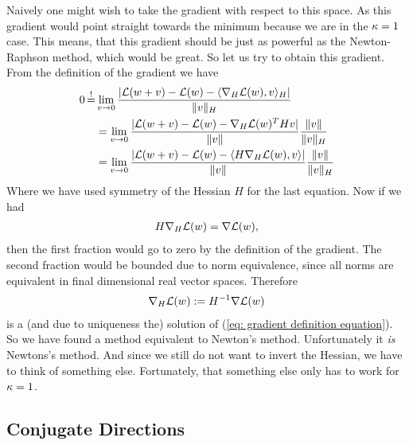 Naively one might wish to take the gradient with respect to this space. As this
gradient would point straight towards the minimum because we are in the
\(\kappa=1\) case. This means, that this gradient should be just as
powerful as the Newton-Raphson method, which would be great. So let us try to
obtain this gradient. From the definition of the gradient we have
\begin{align}
	\label{eq: gradient definition equation}
	0\xeq{!}&\lim_{v\to 0}\frac{
		|\Loss(\weights + v) - \Loss(\weights) - \langle \nabla_H\Loss(\weights), v\rangle_H |
	}{\|v\|_H}\\
	\nonumber
	&=\lim_{v\to 0}\frac{
		|\Loss(\weights + v) - \Loss(\weights) -  \nabla_H\Loss(\weights)^T H v |
	}{\|v\|}
	\frac{\|v\|}{\|v\|_H}\\
	\nonumber
	&=\lim_{v\to 0}\frac{
		|\Loss(\weights + v) - \Loss(\weights) -  \langle H\nabla_H\Loss(\weights), v\rangle |
	}{\|v\|}
	\frac{\|v\|}{\|v\|_H}
\end{align}
Where we have used symmetry of the Hessian \(H\) for the last equation. Now if
we had
\begin{align*}
	H \nabla_H \mathcal{L}(w) = \nabla\mathcal{L}(w),
\end{align*}
then the first fraction would go to zero by the definition of the gradient.
The second fraction would be bounded due to norm equivalence, since all norms
are equivalent in final dimensional real vector spaces. Therefore
\begin{align*}
	\nabla_H \mathcal{L}(w) := H^{-1}\nabla\mathcal{L}(w)
\end{align*}
is a (and due to uniqueness the) solution of (\ref{eq: gradient definition
equation}). So we have found a method equivalent to Newton's method.
Unfortunately it \emph{is} Newtons's method. And since we still do not want
to invert the Hessian, we have to think of something else. Fortunately, that
something else only has to work for \(\kappa=1\).

\subsection{Conjugate Directions}

